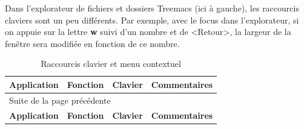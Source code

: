 \documentclass[letterpaper, 12pt]{scrartcl}
\newcommand{\frg}{\rowcolor{red} \color{white} }
\newcommand{\cbc}{\color{white}}
\begin{document}
Dans l'explorateur de fichiers et dossiers Treemacs (ici à gauche), les raccourcis claviers sont un peu différents.  Par exemple, avec le focus dans l'explorateur, si on appuie sur la lettre \textbf{w} suivi d'un nombre et de <Retour>, la largeur de la fenêtre sera modifiée en fonction de ce nombre.

\newpage

{ \scriptsize
\begin{longtable}{|l|l|l|l|}
\caption{Raccourcis clavier et menu contextuel}
\\
\hline
\frg \textbf{Application} & \cbc \textbf{Fonction} & \cbc \textbf{Clavier} & \cbc \textbf{Commentaires}\\
\hline
\endfirsthead
\multicolumn{4}{l}{Suite de la page précédente} \\
\hline

\frg \textbf{Application} & \cbc \textbf{Fonction} & \cbc \textbf{Clavier} & \cbc \textbf{Commentaires} \\


\end{longtable}}
\end{document}
